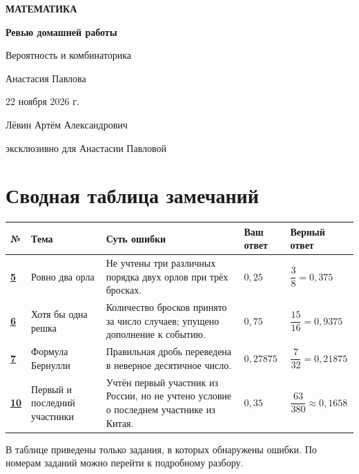 \documentclass[a4paper,12pt]{article}
\begin{document}
\thispagestyle{empty}
\begin{center}
  \vspace*{34mm}
  {\Large\color{accent}\textbf{МАТЕМАТИКА}}\par
  \vspace{20mm}
  {\huge\bfseries Ревью домашней работы}\par
  \vspace{7mm}
  {\Large Вероятность и комбинаторика}\par
  \vspace{13mm}
  {\large Анастасия Павлова}\par
  \vspace{20mm}
  {\large 22 ноября 2026 г.}\par
  \vfill
  {\normalsize Лёвин Артём Александрович}\par
  {\small эксклюзивно для Анастасии Павловой}\par
  \vspace{12mm}
  \vspace{3mm}
\end{center}

\clearpage
\section*{\textcolor{accent}{Сводная таблица замечаний}}
\small
\renewcommand{\arraystretch}{1.45}
\begin{tabularx}{\linewidth}{@{}p{1.0cm}p{3cm}X p{2.25cm}p{2.45cm}@{}}
\toprule
\textbf{№} & \textbf{Тема} & \textbf{Суть ошибки} & \textbf{Ваш ответ} & \textbf{Верный ответ}\\
\midrule
\hyperref[task:5]{\textbf{5}} & Ровно два орла & Не учтены три различных порядка двух орлов при трёх бросках. & $0{,}25$ & $\dfrac38=0{,}375$\\
\hyperref[task:6]{\textbf{6}} & Хотя бы одна решка & Количество бросков принято за число случаев; упущено дополнение к событию. & $0{,}75$ & $\dfrac{15}{16}=0{,}9375$\\
\hyperref[task:7]{\textbf{7}} & Формула Бернулли & Правильная дробь переведена в неверное десятичное число. & $0{,}27875$ & $\dfrac7{32}=0{,}21875$\\
\hyperref[task:10]{\textbf{10}} & Первый и последний участники & Учтён первый участник из России, но не учтено условие о последнем участнике из Китая. & $0{,}35$ & $\dfrac{63}{380}\approx0{,}1658$\\
\bottomrule
\end{tabularx}
\normalsize
\vspace{6mm}
В таблице приведены только задания, в которых обнаружены ошибки. По номерам заданий можно перейти к подробному разбору.
\end{document}

